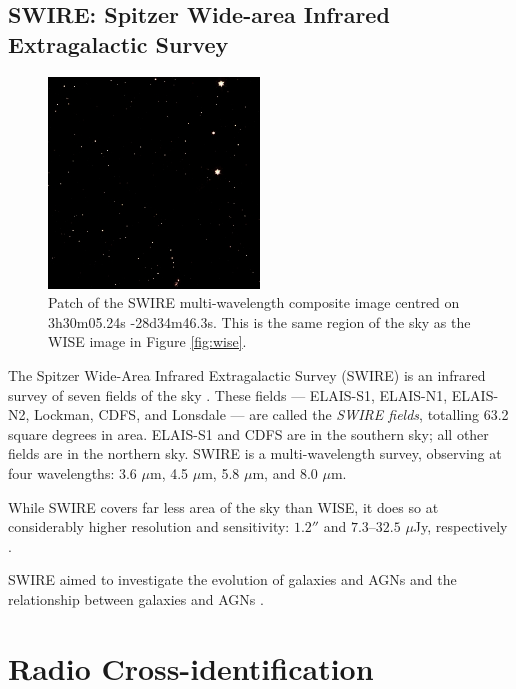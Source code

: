         \subsection{SWIRE: Spitzer Wide-area Infrared Extragalactic Survey}
        \label{sec:swire}

            \begin{figure}[!ht]
                \centering
                \includegraphics[width=0.5\textwidth]{images/swire_small.jpg}
                \caption{Patch of the SWIRE multi-wavelength composite image
                    centred on 3h30m05.24s -28d34m46.3s. This is the same region
                    of the sky as the WISE image in Figure \ref{fig:wise}.}
            \end{figure}

            The Spitzer Wide-Area Infrared Extragalactic Survey (SWIRE) is an
            infrared survey of seven fields of the sky
            \citep{lonsdale03}. These fields --- ELAIS-S1, ELAIS-N1, ELAIS-N2,
            Lockman, CDFS, and Lonsdale --- are called the \emph{SWIRE fields},
            totalling 63.2 square degrees in area. ELAIS-S1 and CDFS are in the
            southern sky; all other fields are in the northern sky. SWIRE is a
            multi-wavelength survey, observing at four wavelengths: 3.6 $\mu$m,
            4.5 $\mu$m, 5.8 $\mu$m, and 8.0 $\mu$m.

            While SWIRE covers far less area of the sky than WISE, it does so at
            considerably higher resolution and sensitivity: $1.2''$ and
            $7.3$--$32.5$ $\mu$Jy, respectively
            \citep{irac-pocket-guide, surace05}.

            SWIRE aimed to investigate the evolution of galaxies and AGNs and
            the relationship between galaxies and AGNs \citep{surace05}.

    \section{Radio Cross-identification}
    \label{sec:radio-cross-identification}


